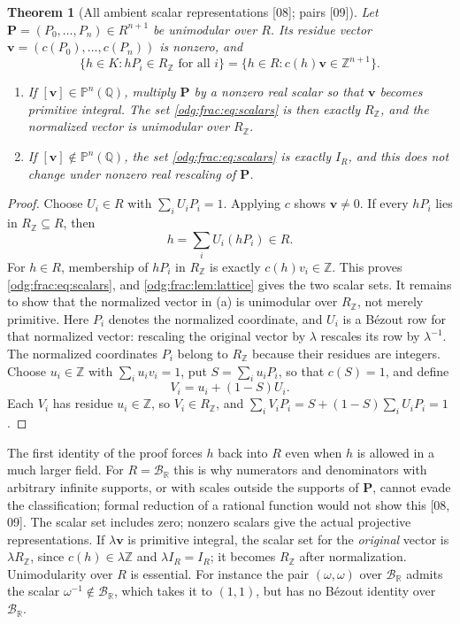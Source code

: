 \documentclass[11pt,oneside]{article}
\numberwithin{equation}{section}
\newtheorem{theorem}{Theorem}[section]
\theoremstyle{definition}
\theoremstyle{remark}
\newcommand{\Z}{\mathbb Z}
\newcommand{\Q}{\mathbb Q}
\newcommand{\R}{\mathbb R}
\newcommand{\BR}{\mathcal B_{\R}}
\newcommand{\src}[1]{\textup{\textsf{\small[#1]}}}
\begin{document}
\begin{theorem}[All ambient scalar representations \src{08}; pairs \src{09}]\label{odg:frac:thm:pullback}
Let $\mathbf P=(P_0,\ldots,P_n)\in R^{n+1}$ be unimodular over $R$. Its residue
vector $\mathbf v=(c(P_0),\ldots,c(P_n))$ is nonzero, and
\begin{equation}\label{odg:frac:eq:scalars}
 \{h\in K:hP_i\in R_\Z\text{ for all }i\}
 =\{h\in R:c(h)\mathbf v\in\Z^{n+1}\}.
\end{equation}
\begin{enumerate}[label=\textup{(\alph*)},leftmargin=*]
\item If $[\mathbf v]\in\mathbb P^n(\Q)$, multiply $\mathbf P$ by a nonzero real
scalar so that $\mathbf v$ becomes primitive integral. The set
\eqref{odg:frac:eq:scalars} is then exactly $R_\Z$, and the normalized vector is
unimodular over $R_\Z$.
\item If $[\mathbf v]\notin\mathbb P^n(\Q)$, the set \eqref{odg:frac:eq:scalars} is
exactly $I_R$, and this does not change under nonzero real rescaling of
$\mathbf P$.
\end{enumerate}
\end{theorem}
\begin{proof}
Choose $U_i\in R$ with $\sum_iU_iP_i=1$. Applying $c$ shows $\mathbf v\ne0$. If
every $hP_i$ lies in $R_\Z\subseteq R$, then
\[
 h=\sum_iU_i(hP_i)\in R .
\]
For $h\in R$, membership of $hP_i$ in $R_\Z$ is exactly $c(h)v_i\in\Z$. This
proves \eqref{odg:frac:eq:scalars}, and \cref{odg:frac:lem:lattice} gives the
two scalar sets. It remains to show that the normalized vector in (a) is
unimodular over $R_\Z$, not merely primitive. Here $P_i$ denotes the
normalized coordinate, and $U_i$ is a B\'ezout row for that normalized
vector: rescaling the original vector by $\lambda$ rescales its row by
$\lambda^{-1}$. The normalized coordinates $P_i$ belong to $R_\Z$
because their residues are integers. Choose $u_i\in\Z$ with
$\sum_iu_iv_i=1$, put $S=\sum_iu_iP_i$, so that $c(S)=1$, and define
\begin{equation}\label{odg:frac:eq:lift}
 V_i=u_i+(1-S)U_i .
\end{equation}
Each $V_i$ has residue $u_i\in\Z$, so $V_i\in R_\Z$, and
$\sum_iV_iP_i=S+(1-S)\sum_iU_iP_i=1$.
\end{proof}

The first identity of the proof forces $h$ back into $R$ even when $h$ is
allowed in a much larger field. For $R=\BR$ this is why numerators and
denominators with arbitrary infinite supports, or with scales outside the
supports of $\mathbf P$, cannot evade the classification; formal reduction of a
rational function would not show this \src{08, 09}.
The scalar set includes zero; nonzero scalars give the actual projective
representations. If $\lambda\mathbf v$ is primitive integral, the scalar
set for the \emph{original} vector is $\lambda R_\Z$, since
$c(h)\in\lambda\Z$ and $\lambda I_R=I_R$; it becomes $R_\Z$ after
normalization. Unimodularity over $R$ is essential. For instance the pair
$(\omega,\omega)$ over $\BR$ admits the scalar $\omega^{-1}\notin\BR$,
which takes it to $(1,1)$, but has no B\'ezout identity over $\BR$.
\end{document}
